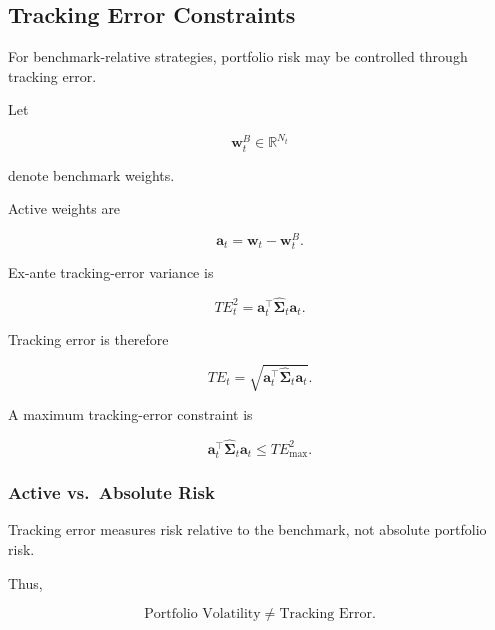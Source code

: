\documentclass[11pt,a4paper]{article}
\begin{document}
\subsection{Tracking Error Constraints}
\label{subsec:tracking_error_constraints}

For benchmark-relative strategies, portfolio risk may be controlled through
tracking error.

Let

\begin{equation}
\mathbf{w}_t^{B}
\in
\mathbb{R}^{N_t}
\end{equation}

denote benchmark weights.

Active weights are

\begin{equation}
\boxed{
\mathbf{a}_t
=
\mathbf{w}_t
-
\mathbf{w}_t^{B}.
}
\end{equation}

Ex-ante tracking-error variance is

\begin{equation}
\boxed{
TE_t^2
=
\mathbf{a}_t^\top
\widehat{\boldsymbol{\Sigma}}_t
\mathbf{a}_t.
}
\end{equation}

Tracking error is therefore

\begin{equation}
\boxed{
TE_t
=
\sqrt{
\mathbf{a}_t^\top
\widehat{\boldsymbol{\Sigma}}_t
\mathbf{a}_t
}.
}
\end{equation}

A maximum tracking-error constraint is

\begin{equation}
\boxed{
\mathbf{a}_t^\top
\widehat{\boldsymbol{\Sigma}}_t
\mathbf{a}_t
\leq
TE_{\max}^{2}.
}
\end{equation}


\subsubsection{Active vs.\ Absolute Risk}

Tracking error measures risk relative to the benchmark, not absolute portfolio
risk.

Thus,

\begin{equation}
\boxed{
\text{Portfolio Volatility}
\neq
\text{Tracking Error}.
}
\end{equation}
\end{document}
